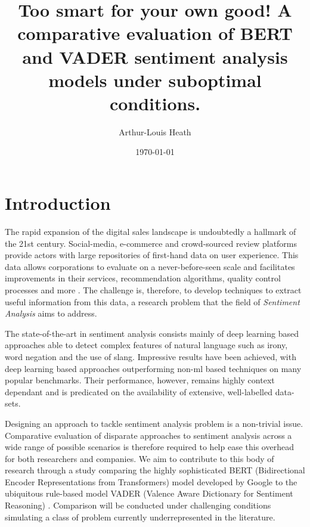 \documentclass{csfourzero}
\title{Too smart for your own good! A comparative evaluation of BERT and VADER sentiment analysis models under suboptimal conditions.}
\author{Arthur-Louis Heath}
\date{\today}
\begin{document}
\maketitle


\section{Introduction}
\label{sec:intro}

The rapid expansion of the digital sales landscape is undoubtedly a hallmark of the 21st century. Social-media, e-commerce and crowd-sourced review platforms provide actors with large repositories of first-hand data on user experience. This data allows corporations to evaluate on a never-before-seen scale and facilitates improvements in their services, recommendation algorithms, quality control processes and more \cite{applications}. The challenge is, therefore, to develop techniques to extract useful information from this data, a research problem that the field of \textit{Sentiment Analysis} aims to address.
\par
The state-of-the-art in sentiment analysis consists mainly of deep learning based approaches able to detect complex features of natural language such as irony, word negation and the use of slang. Impressive results have been achieved, with deep learning based approaches outperforming non-ml based techniques on many popular benchmarks. Their performance, however, remains highly context dependant and is predicated on the availability of extensive, well-labelled data-sets. 
\par
Designing an approach to tackle sentiment analysis problem is a non-trivial issue. Comparative evaluation of disparate approaches to sentiment analysis across a wide range of possible scenarios is therefore required to help ease this overhead for both researchers and companies. We aim to contribute to this body of research through a study comparing the highly sophisticated BERT (Bidirectional Encoder Representations from Transformers) model \cite{BERT1} developed by Google to the ubiquitous rule-based model VADER (Valence Aware Dictionary for Sentiment Reasoning) \cite{vader}. Comparison will be conducted under challenging conditions simulating a class of problem currently underrepresented in the literature.
\end{document}
